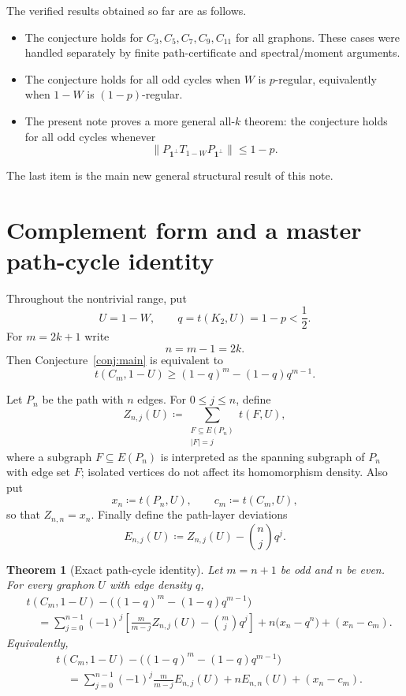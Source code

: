 \documentclass[11pt]{article}
\newtheorem{theorem}{Theorem}[section]
\theoremstyle{definition}
\theoremstyle{remark}
\newcommand{\one}{\mathbf 1}
\newcommand{\defeq}{\coloneqq}
\begin{document}
The verified results obtained so far are as follows.
\begin{itemize}[leftmargin=2em]
  \item The conjecture holds for $C_3,C_5,C_7,C_9,C_{11}$ for all graphons.  These cases were handled separately by finite path-certificate and spectral/moment arguments.
  \item The conjecture holds for all odd cycles when $W$ is $p$-regular, equivalently when $1-W$ is $(1-p)$-regular.
  \item The present note proves a more general all-$k$ theorem: the conjecture holds for all odd cycles whenever
  \[
    \|P_{\one^\perp}T_{1-W}P_{\one^\perp}\|\le 1-p.
  \]
\end{itemize}
The last item is the main new general structural result of this note.

\section{Complement form and a master path-cycle identity}

Throughout the nontrivial range, put
\[
  U=1-W,\qquad q=t(K_2,U)=1-p<\frac12.
\]
For $m=2k+1$ write
\[
  n=m-1=2k.
\]
Then Conjecture~\ref{conj:main} is equivalent to
\begin{equation}\label{eq:complement-form}
  t(C_m,1-U)\ge (1-q)^m-(1-q)q^{m-1}.
\end{equation}

Let $P_n$ be the path with $n$ edges.  For $0\le j\le n$, define
\[
  Z_{n,j}(U)
  \defeq
  \sum_{\substack{F\subseteq E(P_n)\\ |F|=j}} t(F,U),
\]
where a subgraph $F\subseteq E(P_n)$ is interpreted as the spanning subgraph of $P_n$ with edge set $F$; isolated vertices do not affect its homomorphism density.  Also put
\[
  x_n\defeq t(P_n,U),\qquad c_m\defeq t(C_m,U),
\]
so that $Z_{n,n}=x_n$.  Finally define the path-layer deviations
\[
  E_{n,j}(U)
  \defeq
  Z_{n,j}(U)-\binom{n}{j}q^j.
\]

\begin{theorem}[Exact path-cycle identity]\label{thm:path-cycle-identity}
Let $m=n+1$ be odd and $n$ be even.  For every graphon $U$ with edge density $q$,
\begin{equation}\label{eq:master-identity-expanded}
\begin{aligned}
& t(C_m,1-U)-\bigl((1-q)^m-(1-q)q^{m-1}\bigr) \\
&\quad =
\sum_{j=0}^{n-1}(-1)^j
\left[
\frac{m}{m-j}Z_{n,j}(U)-\binom mj q^j
\right]
+n\bigl(x_n-q^n\bigr)+(x_n-c_m).
\end{aligned}
\end{equation}
Equivalently,
\begin{equation}\label{eq:master-identity-E}
\begin{aligned}
& t(C_m,1-U)-\bigl((1-q)^m-(1-q)q^{m-1}\bigr) \\
&\quad =
\sum_{j=0}^{n-1}(-1)^j\frac{m}{m-j}E_{n,j}(U)
+nE_{n,n}(U)+(x_n-c_m).
\end{aligned}
\end{equation}
\end{theorem}
\end{document}
